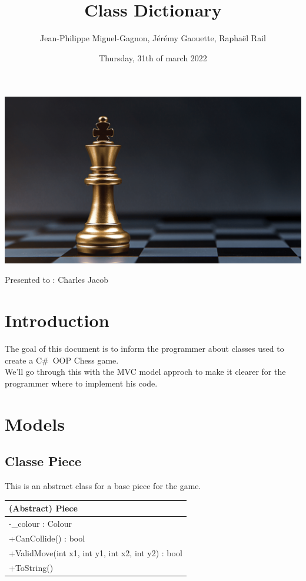 \documentclass[12pt]{article}
\title{Class Dictionary}
\author{Jean-Philippe Miguel-Gagnon, Jérémy Gaouette, Raphaël Rail}
\date{Thursday, 31th of march 2022}
\begin{document}
\begin{titlepage}
\maketitle
\includegraphics[width=\textwidth]{CHESS}
\begin{center}Presented to : Charles Jacob\end{center}
\end{titlepage}

\tableofcontents

\newpage

\section{Introduction}

The goal of this document is to inform the programmer about
classes used to create a C\#\ OOP Chess game.
\\

We'll go through this with the MVC model approch to make it
clearer for the programmer where to implement his code. 

\newpage

\section{Models}

\subsection{Classe Piece}

This is an abstract class for a base piece for the game.
\begin{table}[H]
    \begin{tabular}{|l|}
    \hline
    \cellcolor[HTML]{C0C0C0}\textbf{(Abstract) Piece}            \\ \hline
    \cellcolor[HTML]{EFEFEF}-\_colour : Colour        \\ \hline
    +CanCollide() : bool                                \\ \hline
    +ValidMove(int x1, int y1, int x2, int y2) : bool \\ \hline
    +ToString()                                       \\ \hline
    \end{tabular}
\end{table}
\end{document}
